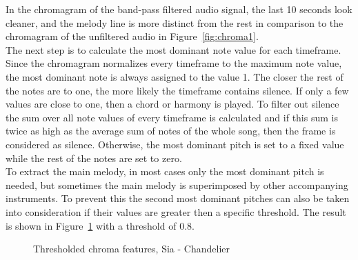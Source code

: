 \noindent In the chromagram of the band-pass filtered audio signal, the last 10 seconds look cleaner, and the melody line is more distinct from the rest in comparison to the chromagram of the unfiltered audio in Figure~\ref{fig:chroma1}.\\
The next step is to calculate the most dominant note value for each timeframe. Since the chromagram normalizes every timeframe to the maximum note value, the most dominant note is always assigned to the value 1. The closer the rest of the notes are to one, the more likely the timeframe contains silence. If only a few values are close to one, then a chord or harmony is played. To filter out silence the sum over all note values of every timeframe is calculated and if this sum is twice as high as the average sum of notes of the whole song, then the frame is considered as silence. Otherwise, the most dominant pitch is set to a fixed value while the rest of the notes are set to zero.\\
\noindent To extract the main melody, in most cases only the most dominant pitch is needed, but sometimes the main melody is superimposed by other accompanying instruments. To prevent this the second most dominant pitches can also be taken into consideration if their values are greater then a specific threshold. The result is shown in Figure~\ref{fig:chromavg} with a threshold of 0.8.
\begin{figure}[htbp]
	\centering
	\caption{Thresholded chroma features, Sia - Chandelier}
	\label{fig:chromavg}
\end{figure}
